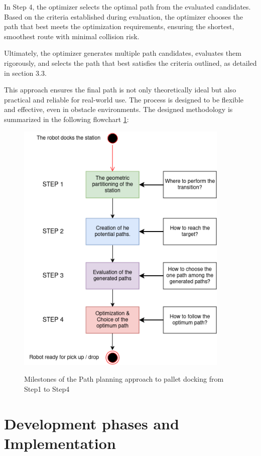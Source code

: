 In Step 4, the optimizer selects the optimal path from the evaluated candidates. Based on the criteria established 
during evaluation, the optimizer chooses the path that best meets the optimization requirements, ensuring the 
shortest, smoothest route with minimal collision risk.

Ultimately, the optimizer generates multiple path candidates, evaluates them rigorously, and selects the path 
that best satisfies the criteria outlined, as detailed in section 3.3.

This approach ensures the final path is not only theoretically ideal but also practical and reliable for real-world 
use. 
The process is designed to be flexible and effective, even in obstacle environments. The designed methodology 
is summarized in the following flowchart \ref{design}:

\begin{figure}[H]
    \begin{center}
        \includegraphics[width=4in]{images/Chap2/Gen_Approach_desing.png}\\
        \caption{Milestones of the Path planning approach to pallet docking from Step1 to Step4}
        \label{design}
        \end{center}
\end{figure}

\section{Development phases and Implementation}

